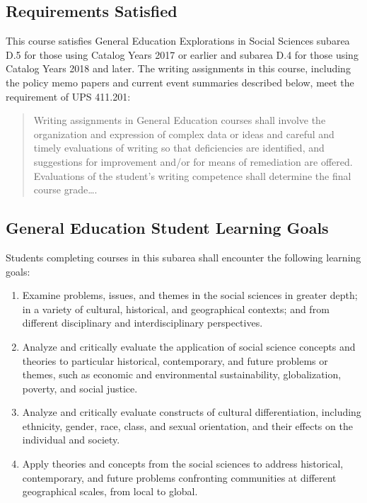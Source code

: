 \documentclass[12pt, letterpaper]{article}
\begin{document}
\subsection*{Requirements Satisfied}

	This course satisfies General Education Explorations in Social Sciences subarea D.5 for those using Catalog Years 2017 or earlier and subarea D.4 for those using Catalog Years 2018 and later. The writing assignments in this course, including the policy memo papers and current event summaries described below, meet the requirement of UPS 411.201: 
	\begin{quote}Writing assignments in General Education courses shall involve the organization and expression of complex data or ideas and careful and timely evaluations of writing so that deficiencies are identified, and suggestions for improvement and/or for means of remediation are offered. Evaluations of the student's writing competence shall determine the final course grade\ldots .\end{quote}

\subsection*{General Education Student Learning Goals}

	Students completing courses in this subarea shall encounter the following learning goals:

\begin{enumerate}
	\item Examine problems, issues, and themes in the social sciences in greater depth; in a variety of cultural, historical, and geographical contexts; and from different disciplinary and interdisciplinary perspectives.
	\item Analyze and critically evaluate the application of social science concepts and theories to particular historical, contemporary, and future problems or themes, such as economic and environmental sustainability, globalization, poverty, and social justice.
	\item Analyze and critically evaluate constructs of cultural differentiation, including ethnicity, gender, race, class, and sexual orientation, and their effects on the individual and society.
	\item Apply theories and concepts from the social sciences to address historical, contemporary, and future problems confronting communities at different geographical scales, from local to global.
\end{enumerate}
\end{document}
